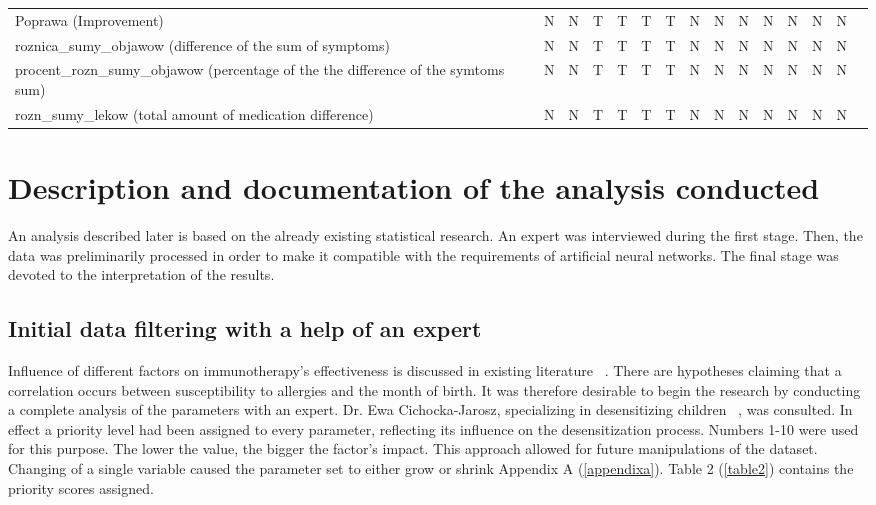 \documentclass[10pt,oneside]{memoir}
\begin{document}
\begin{table}[htbp]
\begin{minipage}{\linewidth}
\begin{tabulary}{\linewidth}{@{}l@{}l@{}l@{}l@{}l@{}l@{}l@{}l@{}l@{}l@{}l@{}l@{}l@{}l@{}l@{}}
Poprawa (Improvement)&N&N&T&T&T&T&N&N&N&N&N&N&N \\
roznica\_sumy\_objawow (difference of the sum of symptoms)&N&N&T&T&T&T&N&N&N&N&N&N&N \\
procent\_rozn\_sumy\_objawow (percentage of the the difference of the symtoms sum)&N&N&T&T&T&T&N&N&N&N&N&N&N \\
rozn\_sumy\_lekow (total amount of medication difference)&N&N&T&T&T&T&N&N&N&N&N&N&N \\

		\bottomrule
	\end{tabulary}
\end{minipage}
\end{table}

\chapter{Description and documentation of the analysis conducted}
\label{descriptionanddocumentationoftheanalysisconducted}

An analysis described later is based on the already existing statistical research. An expert was interviewed during the first stage. Then, the data was preliminarily processed in order to make it compatible with the requirements of artificial neural networks. The final stage was devoted to the interpretation of the results.


\section{Initial data filtering with a help of an expert}
\label{initialdatafilteringwithahelpofanexpert}

Influence of different factors on immunotherapy's effectiveness is discussed in existing literature ~\cite{Alergologia:1998}. There are hypotheses claiming that a correlation occurs between susceptibility to allergies and the month of birth. It was therefore desirable to begin the research by conducting a complete analysis of the parameters with an expert. Dr. Ewa Cichocka-Jarosz, specializing in desensitizing children ~\cite{Cichocka-Jarosz:1997}, was consulted. In effect a priority level had been assigned to every parameter, reflecting its influence on the desensitization process. Numbers 1-10 were used for this purpose. The lower the value, the bigger the factor's impact. This approach allowed for future manipulations of the dataset. Changing of a single variable caused the parameter set to either grow or shrink Appendix A (\autoref{appendixa}). Table 2 (\autoref{table2}) contains the priority scores assigned.
\end{document}
